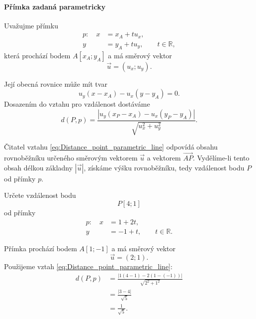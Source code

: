 \paragraph{Přímka zadaná parametricky}

Uvažujme přímku
\[
    \begin{aligned}
        p:\quad x&=x_A+t u_x,\\
                 y&=y_A+t u_y,
                 \qquad t\in\mathbb{R},
    \end{aligned}
\]
která prochází bodem $A[x_A;y_A]$ a má směrový vektor
\[
    \vec{u}=(u_x;u_y).
\]

Její obecná rovnice může mít tvar
\[
    u_y(x-x_A)-u_x(y-y_A)=0.
\]
Dosazením do vztahu pro vzdálenost dostáváme
\begin{equation}\label{eq:Distance_point_parametric_line}
    d(P,p)
    =
    \frac{
        |u_y(x_P-x_A)-u_x(y_P-y_A)|
    }
    {\sqrt{u_x^2+u_y^2}}.
\end{equation}

\begin{remark}\label{rem:Area_interpretation_parametric_distance}
    Čitatel vztahu \eqref{eq:Distance_point_parametric_line} odpovídá
    obsahu rovnoběžníku určeného směrovým vektorem $\vec{u}$ a
    vektorem $\overrightarrow{AP}$. Vydělíme-li tento obsah délkou
    základny $|\vec{u}|$, získáme výšku rovnoběžníku, tedy vzdálenost
    bodu $P$ od přímky $p$.
\end{remark}

\begin{example}\label{exa:Distance_point_parametric_line}
    Určete vzdálenost bodu
    \[
        P[4;1]
    \]
    od přímky
    \[
        \begin{aligned}
            p:\quad x&=1+2t,\\
                     y&=-1+t,
                     \qquad t\in\mathbb{R}.
        \end{aligned}
    \]

    Přímka prochází bodem $A[1;-1]$ a má směrový vektor
    \[
        \vec{u}=(2;1).
    \]
    Použijeme vztah \eqref{eq:Distance_point_parametric_line}:
    \begin{align*}
        d(P,p)
        &=
        \frac{|1(4-1)-2(1-(-1))|}{\sqrt{2^2+1^2}}\\
        &=
        \frac{|3-4|}{\sqrt5}\\
        &=
        \frac{1}{\sqrt5}.
    \end{align*}
\end{example}

